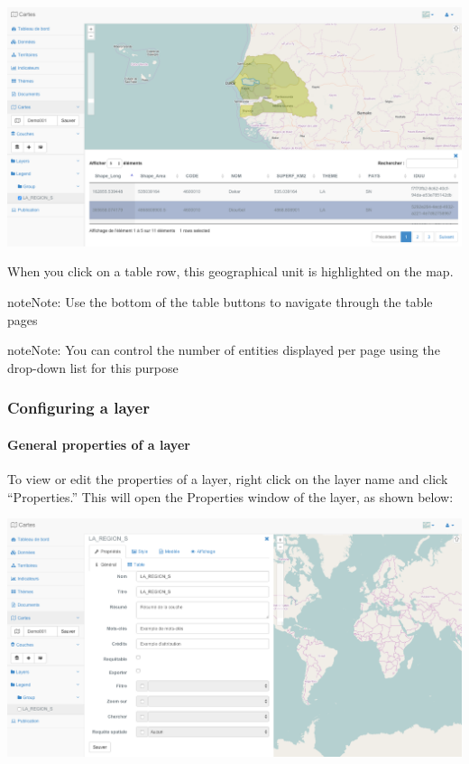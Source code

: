 \documentclass[letterpaper,10pt,english]{sphinxmanual}
\begin{document}
\includegraphics[width=1.000\linewidth]{view-table-window.png}

When you click on a table row, this geographical unit is highlighted on the map.

\begin{notice}{note}{Note:}
Use the bottom of the table buttons to navigate through the table pages
\end{notice}

\begin{notice}{note}{Note:}
You can control the number of entities displayed per page using the drop-down list for this purpose
\end{notice}


\subsubsection{Configuring a layer}
\label{maps/layerstree:configuration-d-une-couche}

\paragraph{General properties of a layer}
\label{maps/layerstree:proprietes-generales-d-une-couche}
To view or edit the properties of a layer, right click on the layer name and click ``Properties.'' This will open the Properties window of the layer, as shown below:

\includegraphics[width=1.000\linewidth]{set-layer-properties-window.png}
\end{document}
